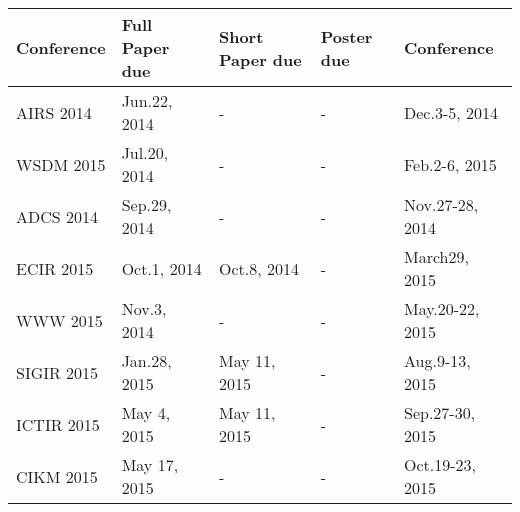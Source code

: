 
{
\sffamily
\rmfamily

\begin{tabular}{ | l | l | l | l | l |}
   \hline
    \bfseries Conference   & \bfseries Full Paper due & \bfseries Short Paper due & \bfseries Poster due & \bfseries Conference \\ \hline     
     \rmfamily AIRS 2014   & \ttfamily Jun.22, 2014   & \ttfamily -               & \ttfamily -          & \ttfamily Dec.3-5, 2014 \\ \hline
     \rmfamily WSDM 2015   & \ttfamily Jul.20, 2014   & \ttfamily -               & \ttfamily -          & \ttfamily Feb.2-6, 2015 \\ \hline
     \rmfamily ADCS 2014   & \ttfamily Sep.29, 2014   & \ttfamily -               & \ttfamily -          & \ttfamily Nov.27-28, 2014 \\ \hline     
     \rmfamily ECIR 2015   & \ttfamily Oct.1, 2014    & \ttfamily Oct.8, 2014     & \ttfamily -          & \ttfamily March29, 2015\\ \hline
     \rmfamily WWW 2015    & \ttfamily Nov.3, 2014    & \ttfamily -               & \ttfamily -          & \ttfamily May.20-22, 2015 \\ \hline
     \rmfamily SIGIR 2015  & \ttfamily Jan.28, 2015   & \ttfamily May 11, 2015    & \ttfamily -          & \ttfamily Aug.9-13, 2015\\ \hline
     \rmfamily ICTIR 2015  & \ttfamily May 4, 2015    & \ttfamily May 11, 2015    & \ttfamily -          & \ttfamily Sep.27-30, 2015\\ \hline
     \rmfamily CIKM 2015   & \ttfamily May 17, 2015   & \ttfamily -               & \ttfamily -          & \ttfamily Oct.19-23, 2015 \\ \hline
       
\end{tabular}
}
